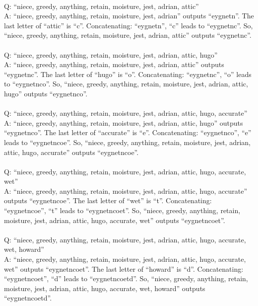 {\\
Q: ``niece, greedy, anything, retain, moisture, jest, adrian, attic'' \\
A: ``niece, greedy, anything, retain, moisture, jest, adrian'' outputs ``eygnetn''. The last letter of ``attic'' is ``c''. Concatenating: ``eygnetn'', ``c'' leads to ``eygnetnc''. So, ``niece, greedy, anything, retain, moisture, jest, adrian, attic'' outputs ``eygnetnc''. \\
\\
Q: ``niece, greedy, anything, retain, moisture, jest, adrian, attic, hugo'' \\
A: ``niece, greedy, anything, retain, moisture, jest, adrian, attic'' outputs ``eygnetnc''. The last letter of ``hugo'' is ``o''. Concatenating: ``eygnetnc'', ``o'' leads to ``eygnetnco''. So, ``niece, greedy, anything, retain, moisture, jest, adrian, attic, hugo'' outputs ``eygnetnco''. \\
\\
Q: ``niece, greedy, anything, retain, moisture, jest, adrian, attic, hugo, accurate'' \\
A: ``niece, greedy, anything, retain, moisture, jest, adrian, attic, hugo'' outputs ``eygnetnco''. The last letter of ``accurate'' is ``e''. Concatenating: ``eygnetnco'', ``e'' leads to ``eygnetncoe''. So, ``niece, greedy, anything, retain, moisture, jest, adrian, attic, hugo, accurate'' outputs ``eygnetncoe''. \\
\\
Q: ``niece, greedy, anything, retain, moisture, jest, adrian, attic, hugo, accurate, wet'' \\
A: ``niece, greedy, anything, retain, moisture, jest, adrian, attic, hugo, accurate'' outputs ``eygnetncoe''. The last letter of ``wet'' is ``t''. Concatenating: ``eygnetncoe'', ``t'' leads to ``eygnetncoet''. So, ``niece, greedy, anything, retain, moisture, jest, adrian, attic, hugo, accurate, wet'' outputs ``eygnetncoet''. \\
\\
Q: ``niece, greedy, anything, retain, moisture, jest, adrian, attic, hugo, accurate, wet, howard'' \\
A: ``niece, greedy, anything, retain, moisture, jest, adrian, attic, hugo, accurate, wet'' outputs ``eygnetncoet''. The last letter of ``howard'' is ``d''. Concatenating: ``eygnetncoet'', ``d'' leads to ``eygnetncoetd''. So, ``niece, greedy, anything, retain, moisture, jest, adrian, attic, hugo, accurate, wet, howard'' outputs ``eygnetncoetd''. \\
}


